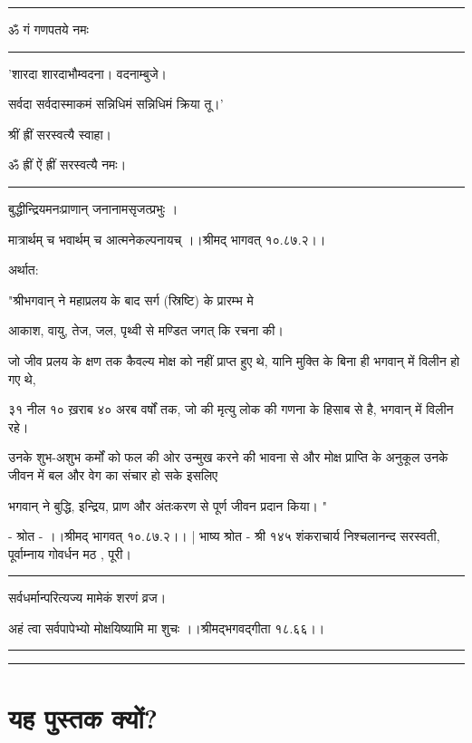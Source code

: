 \documentclass[oneside,12pt]{book} %
\begin{document}
\noindent\rule{7.5cm}{0.4pt}

ॐ गं गणपतये नमः 

\noindent\rule{7.5cm}{0.4pt}

'शारदा शारदाभौम्वदना। वदनाम्बुजे।

सर्वदा सर्वदास्माकमं सन्निधिमं सन्निधिमं क्रिया तू।'

श्रीं ह्रीं सरस्वत्यै स्वाहा।

ॐ ह्रीं ऐं ह्रीं सरस्वत्यै नमः।

\noindent\rule{7.5cm}{0.4pt}


बुद्धीन्द्रियमनःप्राणान्  जनानामसृजत्प्रभुः ।

मात्रार्थम् च भवार्थम् च आत्मनेकल्पनायच् ।।श्रीमद् भागवत् १०.८७.२।। 

अर्थात:

"श्रीभगवान् ने महाप्रलय के बाद सर्ग (स्रिष्टि) के प्रारम्भ मे 

आकाश, वायु, तेज, जल, पृथ्वी से मण्डित जगत् कि रचना की। 

जो जीव प्रलय के क्षण तक कैवल्य मोक्ष को नहीं प्राप्त हुए थे, यानि मुक्ति के बिना ही भगवान् में विलीन हो गए थे, 

३१ नील १० ख़राब ४० अरब वर्षों तक, जो की मृत्यु लोक की गणना के हिसाब से है, भगवान् में विलीन रहे। 

उनके शुभ-अशुभ कर्मों को फल की ओर उन्मुख करने की भावना से और मोक्ष प्राप्ति के अनुकूल उनके जीवन में बल और वेग का संचार हो सके इसलिए 

भगवान् ने बुद्धि, इन्द्रिय, प्राण और अंतःकरण से पूर्ण जीवन प्रदान किया। " 

- श्रोत - ।।श्रीमद् भागवत् १०.८७.२।। |  भाष्य श्रोत - श्री १४५ शंकराचार्य निश्चलानन्द सरस्वती, पूर्वाम्नाय गोवर्धन मठ , पूरी। 

\noindent\rule{7.5cm}{0.4pt}

सर्वधर्मान्परित्यज्य मामेकं शरणं व्रज।

अहं त्वा सर्वपापेभ्यो मोक्षयिष्यामि मा शुचः ।।श्रीमद्भगवद्गीता १८.६६।। 



\noindent\rule{7.5cm}{0.4pt}
\noindent\rule{7.5cm}{0.4pt}


\chapter{यह पुस्तक क्यों?} %
\end{document}
